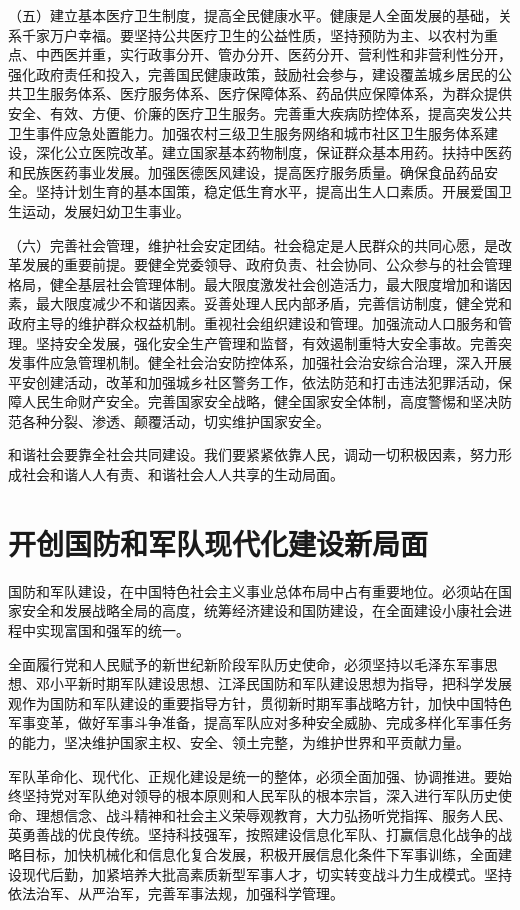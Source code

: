 （五）建立基本医疗卫生制度，提高全民健康水平。健康是人全面发展的基础，关系千家万户幸福。要坚持公共医疗卫生的公益性质，坚持预防为主、以农村为重点、中西医并重，实行政事分开、管办分开、医药分开、营利性和非营利性分开，强化政府责任和投入，完善国民健康政策，鼓励社会参与，建设覆盖城乡居民的公共卫生服务体系、医疗服务体系、医疗保障体系、药品供应保障体系，为群众提供安全、有效、方便、价廉的医疗卫生服务。完善重大疾病防控体系，提高突发公共卫生事件应急处置能力。加强农村三级卫生服务网络和城市社区卫生服务体系建设，深化公立医院改革。建立国家基本药物制度，保证群众基本用药。扶持中医药和民族医药事业发展。加强医德医风建设，提高医疗服务质量。确保食品药品安全。坚持计划生育的基本国策，稳定低生育水平，提高出生人口素质。开展爱国卫生运动，发展妇幼卫生事业。

（六）完善社会管理，维护社会安定团结。社会稳定是人民群众的共同心愿，是改革发展的重要前提。要健全党委领导、政府负责、社会协同、公众参与的社会管理格局，健全基层社会管理体制。最大限度激发社会创造活力，最大限度增加和谐因素，最大限度减少不和谐因素。妥善处理人民内部矛盾，完善信访制度，健全党和政府主导的维护群众权益机制。重视社会组织建设和管理。加强流动人口服务和管理。坚持安全发展，强化安全生产管理和监督，有效遏制重特大安全事故。完善突发事件应急管理机制。健全社会治安防控体系，加强社会治安综合治理，深入开展平安创建活动，改革和加强城乡社区警务工作，依法防范和打击违法犯罪活动，保障人民生命财产安全。完善国家安全战略，健全国家安全体制，高度警惕和坚决防范各种分裂、渗透、颠覆活动，切实维护国家安全。

和谐社会要靠全社会共同建设。我们要紧紧依靠人民，调动一切积极因素，努力形成社会和谐人人有责、和谐社会人人共享的生动局面。

\section{开创国防和军队现代化建设新局面}

国防和军队建设，在中国特色社会主义事业总体布局中占有重要地位。必须站在国家安全和发展战略全局的高度，统筹经济建设和国防建设，在全面建设小康社会进程中实现富国和强军的统一。

全面履行党和人民赋予的新世纪新阶段军队历史使命，必须坚持以毛泽东军事思想、邓小平新时期军队建设思想、江泽民国防和军队建设思想为指导，把科学发展观作为国防和军队建设的重要指导方针，贯彻新时期军事战略方针，加快中国特色军事变革，做好军事斗争准备，提高军队应对多种安全威胁、完成多样化军事任务的能力，坚决维护国家主权、安全、领土完整，为维护世界和平贡献力量。

军队革命化、现代化、正规化建设是统一的整体，必须全面加强、协调推进。要始终坚持党对军队绝对领导的根本原则和人民军队的根本宗旨，深入进行军队历史使命、理想信念、战斗精神和社会主义荣辱观教育，大力弘扬听党指挥、服务人民、英勇善战的优良传统。坚持科技强军，按照建设信息化军队、打赢信息化战争的战略目标，加快机械化和信息化复合发展，积极开展信息化条件下军事训练，全面建设现代后勤，加紧培养大批高素质新型军事人才，切实转变战斗力生成模式。坚持依法治军、从严治军，完善军事法规，加强科学管理。

